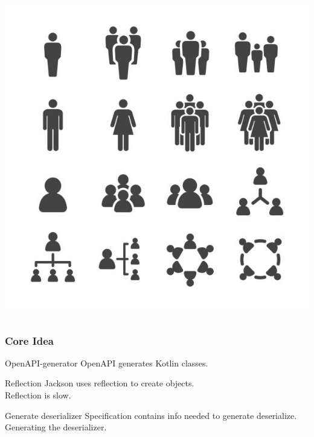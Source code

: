\documentclass{beamer}
\begin{document}
\begin{frame}
\begin{columns}[c]
\begin{column}{.32\textwidth}
\begin{center}
                    \includegraphics[width=\textwidth]{images/freg-bilde.jpg}
                \end{center}
            \end{column}
        \end{columns}
    \end{frame}


    \begin{frame}
        \frametitle{Core Idea}
        \begin{block}{OpenAPI-generator}
            OpenAPI generates Kotlin classes.
        \end{block}
        \begin{block}{Reflection}
            Jackson uses reflection to create objects. \\
            Reflection is slow.
        \end{block}
        \begin{block}{Generate deserializer}
            Specification contains info needed to generate deserialize. \\
            Generating the deserializer.
        \end{block}
    \end{frame}
\end{document}
